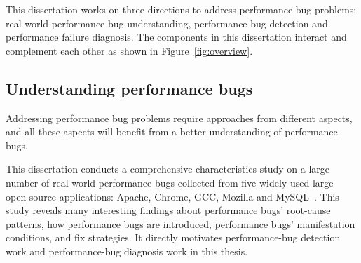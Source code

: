 This dissertation works on three directions to address performance-bug problems:
real-world performance-bug understanding, 
performance-bug detection and performance failure diagnosis. 
The components in this dissertation interact and complement each other as shown in Figure~\ref{fig:overview}.


\subsection{Understanding performance bugs}

Addressing performance bug problems require approaches from different aspects, 
and all these aspects will benefit from a better understanding of performance bugs. 

This dissertation conducts a comprehensive characteristics study on 
a large number of real-world performance bugs collected from five widely used large open-source applications: 
Apache, Chrome, GCC, Mozilla and MySQL~\citep{PerfBug}. 
This study reveals many interesting findings about performance bugs' root-cause patterns, 
how performance bugs are introduced, performance bugs' manifestation conditions, and fix strategies. 
It directly motivates performance-bug detection work and performance-bug diagnosis work in this thesis. 

